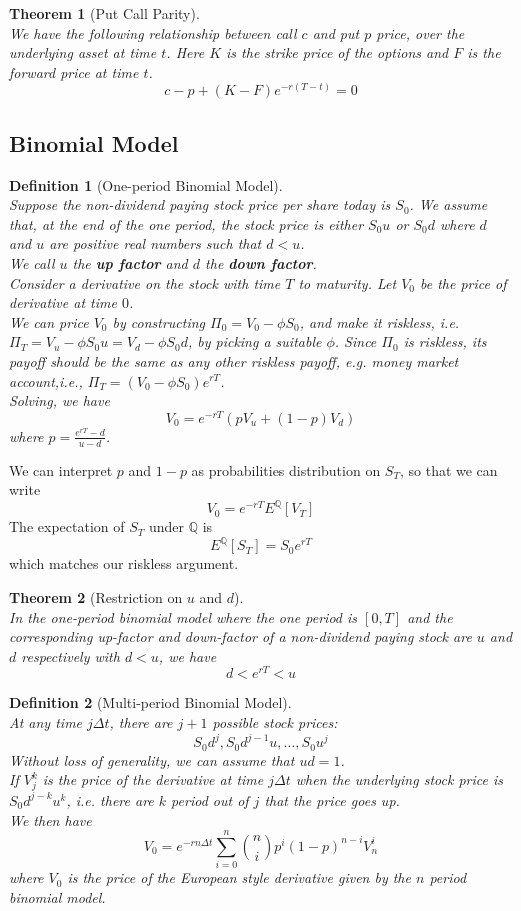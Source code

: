 \documentclass[12pt]{article}
\newtheorem{definition}{Definition}[section]
\newtheorem{theorem}{Theorem}[section]
\theoremstyle{definition}
\begin{document}
\begin{theorem}[Put Call Parity]
\hfill\\\normalfont We have the following relationship between call $c$ and put $p$ price, over the underlying asset at time $t$. Here $K$ is the strike price of the options and $F$ is the forward price at time $t$.
\[
c-p+(K-F)e^{-r(T-t)}=0
\]
\end{theorem}
\subsection{Binomial Model}
\begin{definition}[One-period Binomial Model]
\hfill\\\normalfont Suppose the non-dividend paying stock price per share today is $S_0$. We assume that, at the end of the one period, the stock price is either $S_0u$ or $S_0d$ where $d$ and $u$ are positive real numbers such that $d<u$.\\
We call $u$ the \textbf{up factor} and $d$ the \textbf{down factor}.\\
Consider a derivative on the stock with time $T$ to maturity. Let $V_0$ be the price of derivative at time $0$.\\
We can price $V_0$ by constructing $\Pi_0=V_0-\phi S_0$, and make it riskless, i.e. $\Pi_T = V_u-\phi S_0u=V_d-\phi S_0d$, by picking a suitable $\phi$. Since $\Pi_0$ is riskless, its payoff should be the same as any other riskless payoff, e.g. money market account,i.e., $\Pi_T = (V_0-\phi S_0)e^{rT}$.\\
Solving, we have
\[
V_0 = e^{-rT}(pV_u+(1-p)V_d)
\]
where $p=\frac{e^{rT}-d}{u-d}$.
\end{definition}
We can interpret $p$ and $1-p$ as probabilities distribution on $S_T$, so that we can write
\[
V_0 = e^{-rT}E^\mathbb{Q}[V_T]
\]
The expectation of $S_T$ under $\mathbb{Q}$ is
\[
E^\mathbb{Q}[S_T] = S_0e^{rT}
\]
which matches our riskless argument.
\begin{theorem}[Restriction on {$u$} and {$d$}]
\hfill\\\normalfont In the one-period binomial model where the one period is $[0,T]$ and the corresponding up-factor and down-factor of a non-dividend paying stock are $u$ and $d$ respectively with $d<u$, we have
\[
d<e^{rT}<u
\]
\end{theorem}
\begin{definition}[Multi-period Binomial Model]
\hfill\\\normalfont At any time $j\Delta t$, there are $j+1$ possible stock prices:
\[
S_0d^j, S_0d^{j-1}u,\ldots, S_0u^j
\]
Without loss of generality, we can assume that $ud=1$.\\
If $V_j^k$ is the price of the derivative at time $j\Delta t$ when the underlying stock price is $S_0d^{j-k}u^k$, i.e. there are $k$ period out of $j$ that the price goes up.\\
We then have
\[
V_0 = e^{-rn\Delta t}\sum_{i=0}^n\binom{n}{i}p^i(1-p)^{n-i}V_n^i
\]
where $V_0$ is the price of the European style derivative given by the $n$ period binomial model.
\end{definition}
\end{document}
